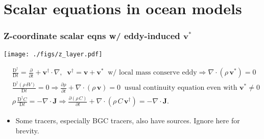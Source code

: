 \documentclass[10pt]{beamer}
\begin{document}
\section{Scalar equations in ocean models}

\begin{frame}
  \frametitle{Z-coordinate scalar eqns w/ eddy-induced ${\bm v}^{*}$}

\begin{center}
\vspace{-.3cm}
{\texttt{[image: ./figs/z\_layer.pdf]}}
\end{center}
\vspace{-.5cm}

\begin{align}
 &\frac{\mathrm{D}^{\dagger}}{\mathrm{D}t} = \frac{\partial }{\partial t} + {\bm v}^{\dagger} \cdot \nabla, 
 \; \; {\bm v}^{\dagger} = {\bm v} + {\bm v}^{*}  \; \; 
 \mbox{w/ local mass conserve eddy}  \Longrightarrow   \nabla \cdot (\rho \, {\bm v}^{*}) = 0 
\\
 &\frac{\mathrm{D}^{\dagger} ( \rho \, \delta V)}{\mathrm{D}t} = 0  \Longrightarrow  
   \frac{\partial \rho}{\partial t} + \nabla \cdot (\rho \, {\bm v}) = 0  
 \; \;  \mbox{usual continuity equation even with ${\bm v}^{*} \ne 0$}
\\
  &\rho \, \frac{\mathrm{D}^{\dagger} C }{\mathrm{D}t} = -\nabla \cdot {\bm J}  \Longrightarrow  
   \frac{\partial (\rho \, C) }{\partial t} + \nabla \cdot (\rho \, C \, {\bm v}^{\dagger} ) = - \nabla \cdot {\bm J}.
\label{eq:z-coordinate-mass-tracer-equation}
\end{align}


\vspace{-.3cm}
\begin{exampleblock}{}
\begin{itemize}
\item Some tracers, especially BGC tracers, also have sources.  Ignore here for brevity.  
\end{itemize}
\end{exampleblock}{}

\end{frame}
\end{document}
